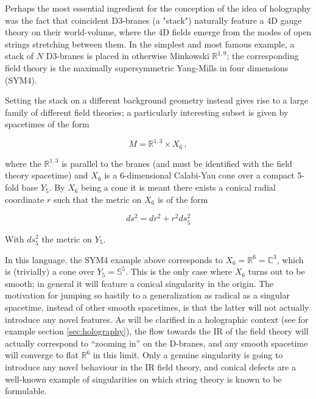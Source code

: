 

Perhaps the most essential ingredient for the conception of the idea of holography was the fact that coincident D3-branes (a "stack") naturally feature a 4D gauge theory on their world-volume, where the 4D fields emerge from the modes of open strings stretching between them. In the simplest and most famous example, a stack of $N$ D3-branes is placed in otherwise Minkowski $\mathbb{R}^{1,9}$; the corresponding field theory is the maximally supersymmetric Yang-Mills in four dimensions (SYM4).

Setting the stack on a different background geometry instead gives rise to a large family of different field theories; a particularly interesting subset is given by spacetimes of the form

\begin{equation} 
	M = \mathbb{R}^{1,3} \times X_6 \,,
\end{equation}

where the $\mathbb{R}^{1,3}$ is parallel to the branes (and must be identified with the field theory spacetime) and $X_6$ is a 6-dimensional Calabi-Yau cone over a compact 5-fold base $Y_5$. By $X_6$ being a cone it is meant there exists a conical radial coordinate $r$ such that the metric on $X_6$ is of the form

\begin{equation}
	ds^2 = dr^2 + r^2 ds_5^2
	\label{}
\end{equation}

With $ds_5^2$ the metric on $Y_5$.

In this language, the SYM4 example above corresponds to $X_6 = \mathbb{R}^6 = \mathbb{C}^3$, which is (trivially) a cone over $Y_5 = \mathbb{S}^5$. This is the only case where $X_6$ turns out to be smooth; in general it will feature a conical singularity in the origin. The motivation for jumping so hastily to a generalization as radical as a singular spacetime, instead of other smooth spacetimes, is that the latter will not actually introduce any novel features. As will be clarified in a holographic context (see for example section \ref{sec:holography}), the flow towards the IR of the field theory will actually correspond to ``zooming in'' on the D-branes, and any smooth spacetime will converge to flat $\mathbb{R}^6$ in this limit. Only a genuine singularity is going to introduce any novel behaviour in the IR field theory, and conical defects are a well-known example of singularities on which string theory is known to be formulable\cite{idk}.

